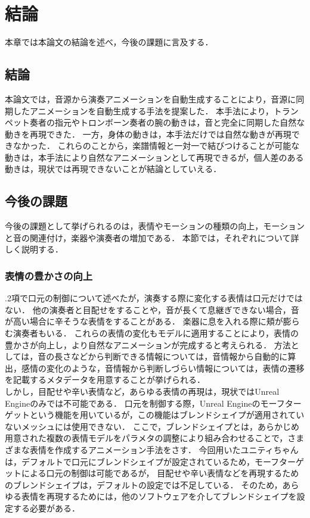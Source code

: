 \chapter{結論}
\label{chap:conclusion}
本章では本論文の結論を述べ，今後の課題に言及する．

\section{結論}\label{sec:conclusion}
本論文では，音源から演奏アニメーションを自動生成することにより，音源に同期したアニメーションを自動生成する手法を提案した．
本手法により，トランペット奏者の指元やトロンボーン奏者の腕の動きは，音と完全に同期した自然な動きを再現できた．
一方，身体の動きは，本手法だけでは自然な動きが再現できなかった．
これらのことから，楽譜情報と一対一で結びつけることが可能な動きは，本手法により自然なアニメーションとして再現できるが，個人差のある動きは，現状では再現できないことが結論としていえる．

\section{今後の課題}
今後の課題として挙げられるのは，表情やモーションの種類の向上，モーションと音の関連付け，楽器や演奏者の増加である．
本節では，それぞれについて詳しく説明する．

\subsection{表情の豊かさの向上}
{.2項}で口元の制御について述べたが，演奏する際に変化する表情は口元だけではない．
他の演奏者と目配せをすることや，音が長くて息継ぎできない場合，音が高い場合に辛そうな表情をすることがある．
楽器に息を入れる際に頬が膨らむ演奏者もいる．
これらの表情の変化もモデルに適用することにより，表情の豊かさが向上し，より自然なアニメーションが完成すると考えられる．
方法としては，音の長さなどから判断できる情報については，音情報から自動的に算出，感情の変化のような，音情報から判断しづらい情報については，表情の遷移を記載するメタデータを用意することが挙げられる．\\
\indent
しかし，目配せや辛い表情など，あらゆる表情の再現は，現状ではUnreal Engineのみでは不可能である．
口元を制御する際，Unreal Engineのモーフターゲットという機能を用いているが，この機能はブレンドシェイプが適用されていないメッシュには使用できない．
ここで，ブレンドシェイプとは，あらかじめ用意された複数の表情モデルをパラメタの調整により組み合わせることで，さまざまな表情を作成するアニメーション手法をさす．
今回用いたユニティちゃんは，デフォルトで口元にブレンドシェイプが設定されているため，モーフターゲットによる口元の制御は可能であるが，
目配せや辛い表情などを再現するためのブレンドシェイプは，デフォルトの設定では不足している．
そのため，あらゆる表情を再現するためには，他のソフトウェアを介してブレンドシェイプを設定する必要がある．

